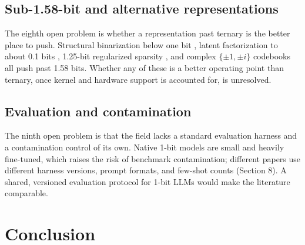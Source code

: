 \documentclass[11pt]{article}
\begin{document}
\subsection{Sub-1.58-bit and alternative representations}

The eighth open problem is whether a representation past ternary is the better place to
push. Structural binarization below one bit \cite{Dong2024-STBLLM}, latent factorization to
about 0.1 bits \cite{Lee2025-LittleBit}, 1.25-bit regularized sparsity \cite{Huang2026-Sherry}, and
complex $\{\pm 1, \pm i\}$ codebooks \cite{Wang2025-iFairy,Wang2025-Fairy2i} all push past
1.58 bits. Whether any of these is a better operating point than ternary, once kernel
and hardware support is accounted for, is unresolved.

\subsection{Evaluation and contamination}

The ninth open problem is that the field lacks a standard evaluation harness and a
contamination control of its own. Native 1-bit models are small and heavily fine-tuned,
which raises the risk of benchmark contamination; different papers use different harness
versions, prompt formats, and few-shot counts (Section 8). A shared, versioned evaluation
protocol for 1-bit LLMs would make the literature comparable.


\section{Conclusion}
\end{document}
